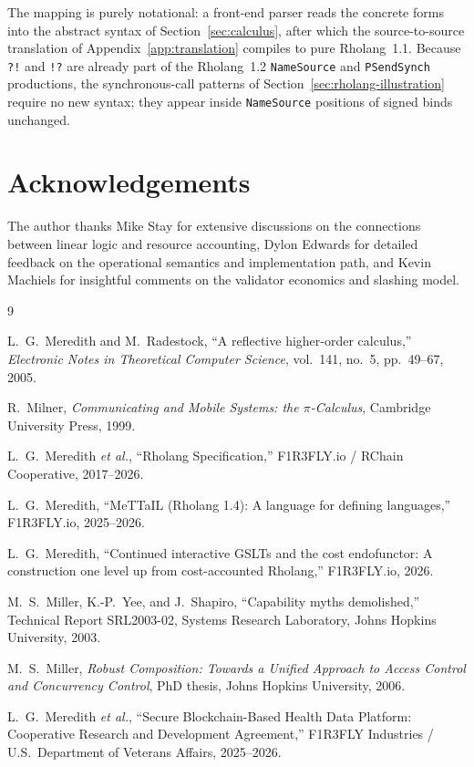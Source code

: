 \documentclass[11pt,a4paper]{article}
\begin{document}
\noindent
The mapping is purely notational: a front-end parser reads the
concrete forms into the abstract syntax of
Section~\ref{sec:calculus}, after which the source-to-source
translation of Appendix~\ref{app:translation} compiles to pure
Rholang~1.1.  Because \verb|?!| and \verb|!?| are already part
of the Rholang~1.2 \texttt{NameSource} and \texttt{PSendSynch}
productions, the synchronous-call patterns of
Section~\ref{sec:rholang-illustration} require no new syntax;
they appear inside \texttt{NameSource} positions of signed
binds unchanged.

\section*{Acknowledgements}

The author thanks Mike Stay for extensive discussions on the
connections between linear logic and resource accounting,
Dylon Edwards for detailed feedback on the operational
semantics and implementation path, and Kevin Machiels for
insightful comments on the validator economics and slashing
model.

\begin{thebibliography}{9}

  L.~G.~Meredith and M.~Radestock,
  ``A reflective higher-order calculus,''
  \textit{Electronic Notes in Theoretical Computer Science},
  vol.~141, no.~5, pp.~49--67, 2005.

  R.~Milner,
  \textit{Communicating and Mobile Systems: the $\pi$-Calculus},
  Cambridge University Press, 1999.

  L.~G.~Meredith \textit{et al.},
  ``Rholang Specification,''
  F1R3FLY.io / RChain Cooperative, 2017--2026.

  L.~G.~Meredith,
  ``MeTTaIL (Rholang 1.4): A language for defining languages,''
  F1R3FLY.io, 2025--2026.

  L.~G.~Meredith,
  ``Continued interactive GSLTs and the cost endofunctor:
  A construction one level up from cost-accounted Rholang,''
  F1R3FLY.io, 2026.

  M.~S.~Miller, K.-P.~Yee, and J.~Shapiro,
  ``Capability myths demolished,''
  Technical Report SRL2003-02, Systems Research Laboratory,
  Johns Hopkins University, 2003.

  M.~S.~Miller,
  \textit{Robust Composition: Towards a Unified Approach to
  Access Control and Concurrency Control},
  PhD thesis, Johns Hopkins University, 2006.

  L.~G.~Meredith \textit{et al.},
  ``Secure Blockchain-Based Health Data Platform: Cooperative
  Research and Development Agreement,''
  F1R3FLY Industries / U.S.\ Department of Veterans Affairs,
  2025--2026.

\end{thebibliography}
\end{document}

